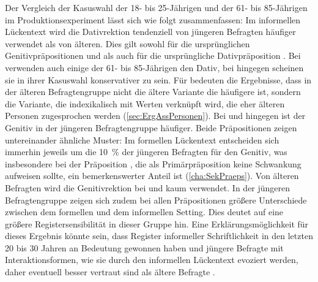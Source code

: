 Der Vergleich der Kasuswahl der 18- bis 25-Jährigen und der 61- bis 85-Jährigen im Produktionsexperiment lässt sich wie folgt zusammenfassen:
Im informellen Lückentext wird die Dativrektion tendenziell von jüngeren Befragten häufiger verwendet als von älteren. 
Dies gilt sowohl für die ursprünglichen Genitivpräpositionen \wegen{} und \waehrend{} als auch für die ursprüngliche Dativpräposition \dank. 
Bei \wegen{} verwenden auch einige der 61- bis 85-Jährigen den Dativ, bei \waehrend{} hingegen scheinen sie in ihrer Kasuswahl konservativer zu sein. 
Für \dank{} bedeuten die Ergebnisse, dass in der älteren Befragtengruppe nicht die ältere Variante die häufigere ist, sondern die Variante, die indexikalisch mit Werten verknüpft wird, die eher älteren Personen zugesprochen werden (\autoref{sec:ErgAssPersonen}).
Bei  und  hingegen ist der Genitiv in der jüngeren Befragtengruppe häufiger. 
Beide Präpositionen zeigen untereinander ähnliche Muster:
Im formellen Lückentext entscheiden sich immerhin jeweils um die 10~\% der jüngeren Befragten für den Genitiv, was insbesondere bei der Präposition , die als Primärpräposition keine Schwankung aufweisen sollte, ein bemerkenswerter Anteil ist (\autoref{cha:SekPraeps}). 
Von älteren Befragten wird die Genitivrektion bei \gegenueber{} und  kaum verwendet. 
In der jüngeren Befragtengruppe zeigen sich zudem bei allen Präpositionen größere Unterschiede zwischen dem formellen und dem informellen Setting. 
Dies deutet auf eine größere Registersensibilität in dieser Gruppe hin. 
Eine Erklärungsmöglichkeit für dieses Ergebnis könnte sein, dass Register informeller Schriftlichkeit in den letzten 20 bis 30 Jahren an Bedeutung gewonnen haben und jüngere Befragte mit Interaktionsformen, wie sie durch den informellen Lückentext evoziert werden, daher eventuell besser vertraut sind als ältere Befragte \citep[s.][174--175]{Wolfer.2020}. 
